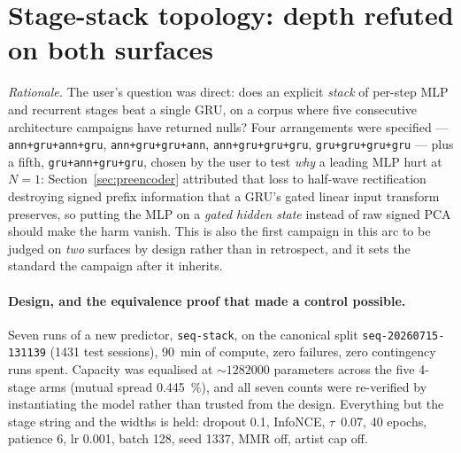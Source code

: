 \documentclass[11pt]{article}
\newcommand{\dsid}[1]{\texttt{\small #1}}
\begin{document}
\section{Stage-stack topology: depth refuted on both surfaces}
\label{sec:stagestack}
\emph{Rationale.} The user's question was direct: does an explicit \emph{stack} of
per-step MLP and recurrent stages beat a single GRU, on a corpus where five
consecutive architecture campaigns have returned nulls? Four arrangements were
specified --- \texttt{ann+gru+ann+gru}, \texttt{ann+gru+gru+ann},
\texttt{ann+gru+gru+gru}, \texttt{gru+gru+gru+gru} --- plus a fifth,
\texttt{gru+ann+gru+gru}, chosen by the user to test \emph{why} a leading MLP hurt
at $N=1$: Section~\ref{sec:preencoder} attributed that loss to half-wave
rectification destroying signed prefix information that a GRU's gated linear input
transform preserves, so putting the MLP on a \emph{gated hidden state} instead of
raw signed PCA should make the harm vanish. This is also the first campaign in this
arc to be judged on \emph{two} surfaces by design rather than in retrospect, and it
sets the standard the campaign after it inherits.

\paragraph{Design, and the equivalence proof that made a control possible.} Seven
runs of a new predictor, \texttt{seq-stack}, on the canonical split
\dsid{seq-20260715-131139} (\num{1431} test sessions), \SI{90}{\minute} of compute,
zero failures, zero contingency runs spent. Capacity was equalised at
${\sim}\num{1282000}$ parameters across the five 4-stage arms (mutual spread
\SI{0.445}{\percent}), and all seven counts were re-verified by instantiating the
model rather than trusted from the design. Everything but the stage string and the
widths is held: dropout \num{0.1}, InfoNCE, $\tau$~\num{0.07}, \num{40} epochs,
patience \num{6}, lr \num{0.001}, batch \num{128}, seed \num{1337}, MMR off, artist
cap off.
\end{document}
